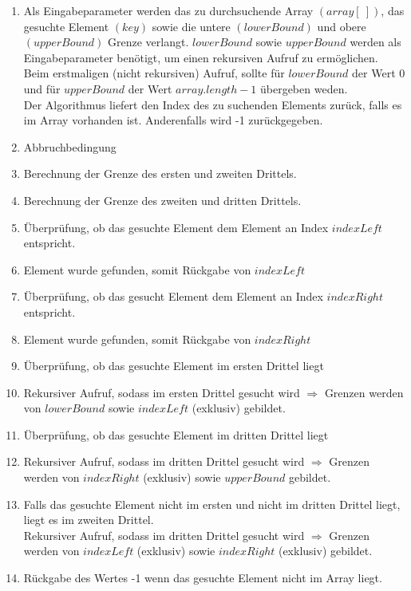 \documentclass[a4paper]{scrartcl}
\begin{document}
\begin{enumerate}
	\item 
	Als Eingabeparameter werden das zu durchsuchende Array $(array\left[ ~ \right])$, das gesuchte Element $(key)$ sowie die untere $(lowerBound)$ und obere $(upperBound)$ Grenze verlangt.
	$lowerBound$ sowie $upperBound$ werden als Eingabeparameter benötigt, um einen rekursiven Aufruf zu ermöglichen. Beim erstmaligen (nicht rekursiven) Aufruf, sollte für $lowerBound$ der Wert $0$ und für $upperBound$ der Wert $array.length-1$ übergeben weden. \\ 
	Der Algorithmus liefert den Index des zu suchenden Elements zurück, falls es im Array vorhanden ist. Anderenfalls wird -1 zurückgegeben.
	
	\item
	Abbruchbedingung
	
	\item
	Berechnung der Grenze des ersten und zweiten Drittels.
	
	\item
	Berechnung der Grenze des zweiten und dritten Drittels.
	
	\item
	Überprüfung, ob das gesuchte Element dem Element an Index $indexLeft$ entspricht. 
	
	\item \setcounter{enumi}{7}
	Element wurde gefunden, somit Rückgabe von $indexLeft$
	
	\item
	Überprüfung, ob das gesucht Element dem Element an Index $indexRight$ entspricht. 
	
	\item \setcounter{enumi}{10}
	Element wurde gefunden, somit Rückgabe von $indexRight$
	
	\item
	Überprüfung, ob das gesuchte Element im ersten Drittel liegt
	
	\item \setcounter{enumi}{13}
	Rekursiver Aufruf, sodass im ersten Drittel gesucht wird $\Rightarrow$ Grenzen werden von $lowerBound$ sowie $indexLeft$ (exklusiv) gebildet.
	
	\item
	Überprüfung, ob das gesuchte Element im dritten Drittel liegt
	
	\item \setcounter{enumi}{16}
	Rekursiver Aufruf, sodass im dritten Drittel gesucht wird $\Rightarrow$ Grenzen werden von $indexRight$ (exklusiv) sowie $upperBound$ gebildet.
	
	\item \setcounter{enumi}{18}
	Falls das gesuchte Element nicht im ersten und nicht im dritten Drittel liegt, liegt es im zweiten Drittel.\\
	Rekursiver Aufruf, sodass im dritten Drittel gesucht wird $\Rightarrow$ Grenzen werden von $indexLeft$ (exklusiv) sowie $indexRight$ (exklusiv) gebildet.
	
	\item
	Rückgabe des Wertes -1 wenn das gesuchte Element nicht im Array liegt.
	
\end{enumerate}
\end{document}
